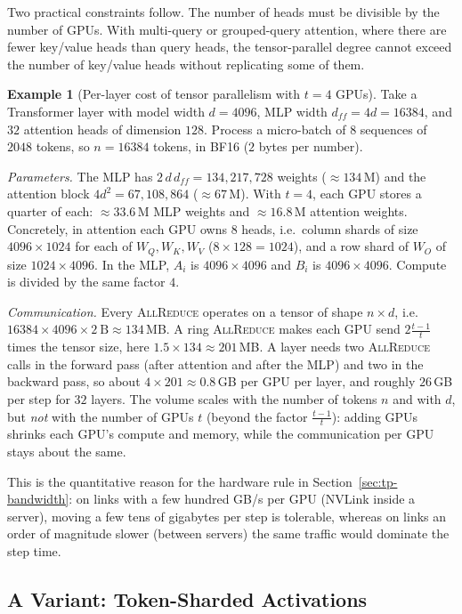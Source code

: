 \documentclass[11pt,a4paper]{article}
\theoremstyle{definition}
\newtheorem{example}[definition]{Example}
\theoremstyle{remark}
\theoremstyle{plain}
\begin{document}
Two practical constraints follow. The number of heads must be divisible
by the number of GPUs. With multi-query or grouped-query attention, where
there are fewer key/value heads than query heads, the tensor-parallel
degree cannot exceed the number of key/value heads without replicating
some of them.

\begin{example}[Per-layer cost of tensor parallelism with $t=4$ GPUs]
\label{ex:tp-cost}
Take a Transformer layer with model width $d=4096$, MLP width
$d_{ff}=4d=16384$, and $32$ attention heads of dimension $128$. Process a
micro-batch of $8$ sequences of $2048$ tokens, so $n=16384$ tokens, in
BF16 ($2$ bytes per number).

\emph{Parameters.} The MLP has $2\,d\,d_{ff}=134{,}217{,}728$ weights
($\approx134$\,M) and the attention block $4d^2=67{,}108{,}864$
($\approx67$\,M). With $t=4$, each GPU stores a quarter of each:
$\approx 33.6$\,M MLP weights and $\approx 16.8$\,M attention weights.
Concretely, in attention each GPU owns $8$ heads, i.e.\ column shards of
size $4096\times1024$ for each of $W_Q,W_K,W_V$ ($8\times128=1024$), and a
row shard of $W_O$ of size $1024\times4096$. In the MLP, $A_i$ is
$4096\times4096$ and $B_i$ is $4096\times4096$. Compute is divided by the
same factor $4$.

\emph{Communication.} Every \textsc{AllReduce} operates on a tensor of
shape $n\times d$, i.e.\ $16384\times4096\times2\ \text{B}\approx134$\,MB.
A ring \textsc{AllReduce} makes each GPU send $2\frac{t-1}{t}$ times the
tensor size, here $1.5\times134\approx201$\,MB. A layer needs two
\textsc{AllReduce} calls in the forward pass (after attention and after
the MLP) and two in the backward pass, so about $4\times201\approx0.8$\,GB
per GPU per layer, and roughly $26$\,GB per step for $32$ layers. The
volume scales with the number of tokens $n$ and with $d$, but \emph{not}
with the number of GPUs $t$ (beyond the factor $\tfrac{t-1}{t}$): adding
GPUs shrinks each GPU's compute and memory, while the communication per
GPU stays about the same.
\end{example}

This is the quantitative reason for the hardware rule in
Section~\ref{sec:tp-bandwidth}: on links with a few hundred GB/s per GPU
(NVLink inside a server), moving a few tens of gigabytes per step is
tolerable, whereas on links an order of magnitude slower (between
servers) the same traffic would dominate the step time.

\subsection{A Variant: Token-Sharded Activations}
\end{document}
